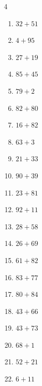 \begin{multicols}{4}
\begin{enumerate}
  \item $32+51$
        \phantom{$=83$}

  \item $4+95$
        \phantom{$=99$}

  \item $27+19$
        \phantom{$=46$}

  \item $85+45$
        \phantom{$=130$}

  \item $79+2$
        \phantom{$=81$}

  \item $82+80$
        \phantom{$=162$}

  \item $16+82$
        \phantom{$=98$}

  \item $63+3$
        \phantom{$=66$}

  \item $21+33$
        \phantom{$=54$}

  \item $90+39$
        \phantom{$=129$}

  \item $23+81$
        \phantom{$=104$}

  \item $92+11$
        \phantom{$=103$}

  \item $28+58$
        \phantom{$=86$}

  \item $26+69$
        \phantom{$=95$}

  \item $61+82$
        \phantom{$=143$}

  \item $83+77$
        \phantom{$=160$}

  \item $80+84$
        \phantom{$=164$}

  \item $43+66$
        \phantom{$=109$}

  \item $43+73$
        \phantom{$=116$}

  \item $68+1$
        \phantom{$=69$}

  \item $52+21$
        \phantom{$=73$}

  \item $6+11$
        \phantom{$=17$}


\end{enumerate}
\end{multicols}

